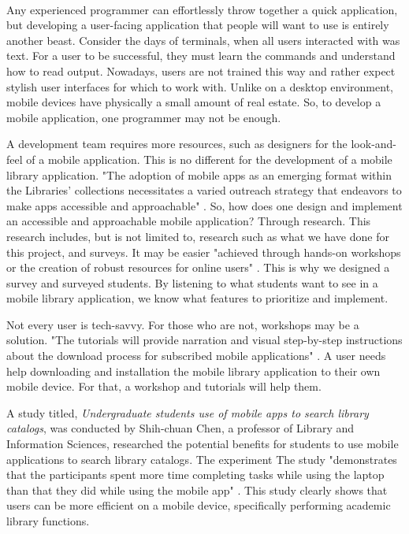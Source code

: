     \paragraph{}
    Any experienced programmer can effortlessly throw together a quick application, but developing a user-facing application that people will want to use is entirely another beast. Consider the days of terminals, when all users interacted with was text. For a user to be successful, they must learn the commands and understand how to read output. Nowadays, users are not trained this way and rather expect stylish user interfaces for which to work with. Unlike on a desktop environment, mobile devices have physically a small amount of real estate. So, to develop a mobile application, one programmer may not be enough.
    
    A development team requires more resources, such as designers for the look-and-feel of a mobile application. This is no different for the development of a mobile library application. "The adoption of mobile apps as an emerging format within the Libraries’ collections necessitates a varied outreach strategy that endeavors to make apps accessible and approachable" \cite{saragossi_costello_kasten_2018}. So, how does one design and implement an accessible and approachable mobile application? Through research. This research includes, but is not limited to, research such as what we have done for this project, and surveys. It may be easier "achieved through hands-on workshops or the creation of robust resources for online users" \cite{saragossi_costello_kasten_2018}. This is why we designed a survey and surveyed students. By listening to what students want to see in a mobile library application, we know what features to prioritize and implement.
    
    Not every user is tech-savvy. For those who are not, workshops may be a solution. "The tutorials will provide narration and visual step-by-step instructions about the download process for subscribed mobile applications" \cite{saragossi_costello_kasten_2018}. A user needs help downloading and installation the mobile library application to their own mobile device. For that, a workshop and tutorials will help them.
    
    A study titled, \textit{Undergraduate students use of mobile apps to search library catalogs}, was conducted by Shih-chuan Chen, a professor of Library and Information Sciences, researched the potential benefits for students to use mobile applications to search library catalogs. The experiment The study "demonstrates that the participants spent more time completing tasks while using the laptop than that they did while using the mobile app" \cite{given_one}. This study clearly shows that users can be more efficient on a mobile device, specifically performing academic library functions.
    
